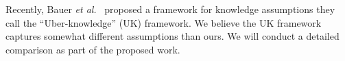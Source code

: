 {\begin{itemize}
 
Recently, Bauer \emph{et al.}~\cite{EPRINT:BFHK23}  proposed a framework for knowledge assumptions they call the ``Uber-knowledge'' (UK) framework. We believe the UK framework   captures somewhat different assumptions than ours. 
We will conduct a detailed comparison as part of the proposed work. 
\fi

\iffalse

\end{itemize}}

